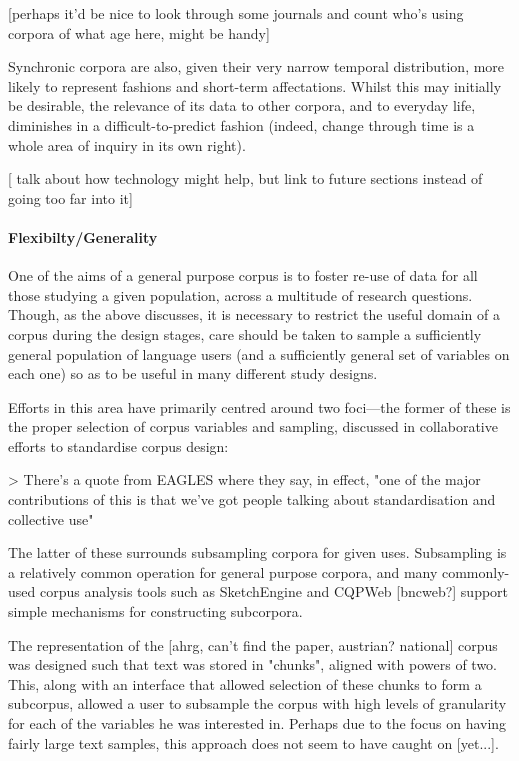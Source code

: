 [perhaps it'd be nice to look through some journals and count who's using corpora of what age here, might be handy]

Synchronic corpora are also, given their very narrow temporal distribution, more likely to represent fashions and short-term affectations.  Whilst this may initially be desirable, the relevance of its data to other corpora, and to everyday life, diminishes in a difficult-to-predict fashion (indeed, change through time is a whole area of inquiry in its own right).

[ talk about how technology might help, but link to future sections instead of going too far into it]




\paragraph{Flexibilty/Generality}
One of the aims of a general purpose corpus is to foster re-use of data for all those studying a given population, across a multitude of research questions.  Though, as the above discusses, it is necessary to restrict the useful domain of a corpus during the design stages, care should be taken to sample a sufficiently general population of language users (and a sufficiently general set of variables on each one) so as to be useful in many different study designs.

Efforts in this area have primarily centred around two foci---the former of these is the proper selection of corpus variables and sampling, discussed in collaborative efforts to standardise corpus design:

> There's a quote from EAGLES where they say, in effect, "one of the major contributions of this is that we've got people talking about standardisation and collective use"


The latter of these surrounds subsampling corpora for given uses.  Subsampling is a relatively common operation for general purpose corpora, and many commonly-used corpus analysis tools such as SketchEngine and CQPWeb [bncweb?] support simple mechanisms for constructing subcorpora.

The representation of the [ahrg, can't find the paper, austrian? national] corpus was designed such that text was stored in "chunks", aligned with powers of two.  This, along with an interface that allowed selection of these chunks to form a subcorpus, allowed a user to subsample the corpus with high levels of granularity for each of the variables he was interested in.  Perhaps due to the focus on having fairly large text samples, this approach does not seem to have caught on [yet...].





